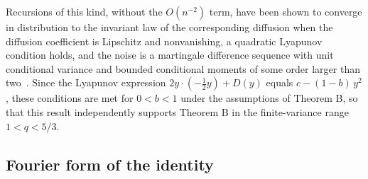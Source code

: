 \documentclass[aip,jmp,preprint,onecolumn,floatfix,superscriptaddress,nofootinbib,11pt]{revtex4-2}
\theoremstyle{plain}
\theoremstyle{remark}
\numberwithin{equation}{section}
\begin{document}
Recursions of this kind, without the $O(n^{-2})$ term, have been shown to converge in distribution to the invariant law of the corresponding diffusion when the diffusion coefficient is Lipschitz and nonvanishing, a quadratic Lyapunov condition holds, and the noise is a martingale difference sequence with unit conditional variance and bounded conditional moments of some order larger than two~\cite{BHW}. Since the Lyapunov expression $2y\cdot(-\tfrac12y)+D(y)$ equals $c-(1-b)\,y^{2}$, these conditions are met for $0<b<1$ under the assumptions of Theorem B, so that this result independently supports Theorem B in the finite-variance range $1<q<5/3$.

\subsection{Fourier form of the identity}\label{sec:2_4}
\end{document}
